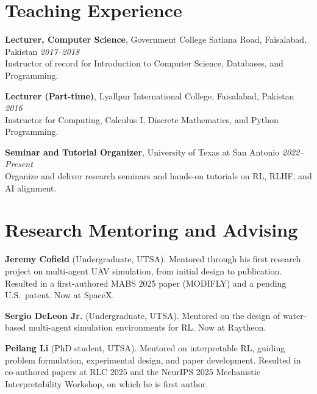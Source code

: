 \documentclass[letterpaper,11pt]{article}
\begin{document}
\section*{Teaching Experience}

\textbf{Lecturer, Computer Science}, Government College Satiana Road, Faisalabad, Pakistan \hfill \textit{2017--2018}\\
Instructor of record for Introduction to Computer Science, Databases, and Programming.

\textbf{Lecturer (Part-time)}, Lyallpur International College, Faisalabad, Pakistan \hfill \textit{2016}\\
Instructor for Computing, Calculus I, Discrete Mathematics, and Python Programming.

\textbf{Seminar and Tutorial Organizer}, University of Texas at San Antonio \hfill \textit{2022--Present}\\
Organize and deliver research seminars and hands-on tutorials on RL, RLHF, and AI alignment.


\section*{Research Mentoring and Advising}
\begin{cvlist}
    \item \textbf{Jeremy Cofield} (Undergraduate, UTSA). Mentored through his first research project on multi-agent UAV simulation, from initial design to publication. Resulted in a first-authored MABS 2025 paper (MODIFLY) and a pending U.S.\ patent. Now at SpaceX.
    \item \textbf{Sergio DeLeon Jr.} (Undergraduate, UTSA). Mentored on the design of water-based multi-agent simulation environments for RL. Now at Raytheon.
    \item \textbf{Peilang Li} (PhD student, UTSA). Mentored on interpretable RL, guiding problem formulation, experimental design, and paper development. Resulted in co-authored papers at RLC 2025 and the NeurIPS 2025 Mechanistic Interpretability Workshop, on which he is first author.
\end{cvlist}
\end{document}
